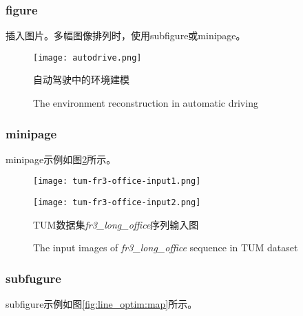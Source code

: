 \subsubsection{figure}

插入图片。多幅图像排列时，使用subfigure或minipage。
\begin{figure}[htb]
	\centering
	\texttt{[image: autodrive.png]}
	\caption{自动驾驶中的环境建模\protect\footnotemark[1]}
	\label{fig:introduction:autodrive}
	\addtocounter{figure}{-1}
	\renewcommand{\figurename}{Fig.}
	\caption{The environment reconstruction in automatic driving}
\end{figure}

\subsubsection{minipage}
minipage示例如图\ref{fig:line_optim:input}所示。

\begin{figure}[htb]
	\centering
	\begin{minipage}[t]{0.45\textwidth}
		\centering
		\texttt{[image: tum-fr3-office-input1.png]}
		\label{fig:line_optim:input1}
	\end{minipage}
	\vspace{0.1in} %
	\begin{minipage}[t]{0.45\textwidth}
		\centering
		\texttt{[image: tum-fr3-office-input2.png]}
		\label{fig:line_optim:input2}
	\end{minipage}
	\vspace{0.1in}
	\caption{TUM数据集{\itshape fr3\_long\_office}序列输入图}
	\label{fig:line_optim:input}
	\addtocounter{figure}{-1} %
	\renewcommand{\figurename}{Fig.}
	\caption{The input images of {\itshape fr3\_long\_office} sequence in TUM dataset}
\end{figure}

\subsubsection{subfugure}
subfigure示例如图\ref{fig:line_optim:map}所示。

